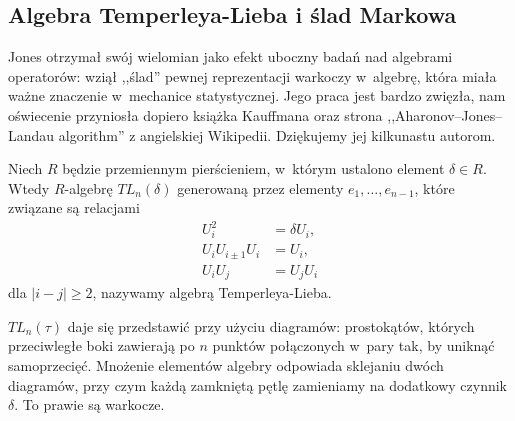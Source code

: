 
\subsection{Algebra Temperleya-Lieba i ślad Markowa}

Jones otrzymał swój wielomian jako efekt uboczny badań nad algebrami operatorów: wziął ,,ślad'' pewnej reprezentacji warkoczy w~algebrę, która miała ważne znaczenie w~mechanice statystycznej.
%
Jego praca \cite{jones1985} jest bardzo zwięzła, nam oświecenie przyniosła dopiero książka Kauffmana \cite[s. 85-103]{kauffman1991} oraz strona ,,Aharonov–Jones–Landau algorithm'' z angielskiej Wikipedii.
%
Dziękujemy jej kilkunastu autorom.

\begin{definition}
\label{def:temperley_lieb}%
%
    Niech $R$ będzie przemiennym pierścieniem, w~którym ustalono element $\delta \in R$.
    Wtedy $R$-algebrę $TL_n(\delta)$ generowaną przez elementy $e_1, \ldots, e_{n-1}$, które związane są relacjami
    \begin{align}
        U_i^2 & = \delta U_i, \\
        U_i U_{i \pm 1} U_i & = U_i, \\
        U_i U_j & = U_j U_i
    \end{align}
    dla $|i-j| \ge 2$, nazywamy algebrą Temperleya-Lieba.
\end{definition}

$TL_n(\tau)$ daje się przedstawić przy użyciu diagramów: prostokątów, których przeciwległe boki zawierają po $n$ punktów połączonych w~pary tak, by uniknąć samoprzecięć.
Mnożenie elementów algebry odpowiada sklejaniu dwóch diagramów, przy czym każdą zamkniętą pętlę zamieniamy na dodatkowy czynnik $\delta$.
To prawie są warkocze.

\begin{comment}
  \begin{figure}[H]
    \centering
    \begin{minipage}[b]{.19\linewidth}
        \[\MedLarTemperleyA\]
        \subcaption{$1$}
    \end{minipage}
    \begin{minipage}[b]{.19\linewidth}
        \[\MedLarTemperleyC\]
        \subcaption{$U_1$}
    \end{minipage}
    \begin{minipage}[b]{.19\linewidth}
        \[\MedLarTemperleyB\]
        \subcaption{$U_2$}
    \end{minipage}
    \begin{minipage}[b]{.19\linewidth}
        \[\MedLarTemperleyD\]
        \subcaption{$U_1U_2$}
    \end{minipage}
    \begin{minipage}[b]{.19\linewidth}
        \[\MedLarTemperleyE\]
        \subcaption{$U_2U_1$}
    \end{minipage}
    \caption{Diagramatyczne przedstawienie elementów algebry $TL_3(\delta)$}
    \end{figure}
\end{comment}

